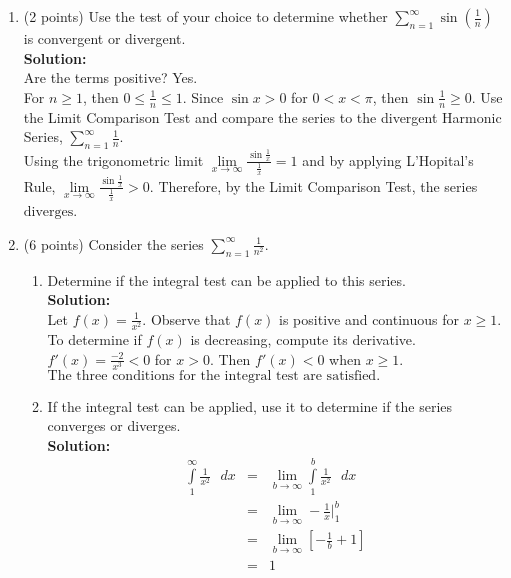 \documentclass[paper=a4, fontsize=11pt]{scrartcl} %
\numberwithin{equation}{section} %
\numberwithin{figure}{section} %
\numberwithin{table}{section} %
\begin{document}
\begin{enumerate}
\item (2 points) Use the test of your choice to determine whether 
$\sum\limits_{n=1}^\infty \sin \left( \frac{1}{n} \right)$ is convergent or divergent. \\
\noindent\textbf{Solution:}\\
Are the terms positive? Yes.\\
For $n \ge 1$, then $0 \le \frac{1}{n} \le 1$.  Since $\sin x > 0$ for $0 < x < \pi$, then $\sin \frac{1}{n} \ge 0$. Use the Limit Comparison Test and compare the series to the divergent Harmonic Series, $\sum\limits_{n=1}^\infty \frac{1}{n}$. \\

Using the trigonometric limit $\lim\limits_{x \rightarrow \infty} \frac{\sin \frac{1}{x}}{\frac{1}{x}}=1$ and by applying L'Hopital's Rule,  $\lim\limits_{x \rightarrow \infty} \frac{\sin \frac{1}{x}}{\frac{1}{x}}>0$. Therefore, by the Limit Comparison Test, the series $\boxed{ \text{diverges}}$.


\newpage

\item (6 points) Consider the series $\sum\limits_{n=1}^\infty \frac{1}{n^2}$.
\begin{enumerate}
\item Determine if the integral test can be applied to this series.\\
\noindent\textbf{Solution:}\\
Let $f(x)=\frac{1}{x^2}$. Observe that $f(x)$ is positive and continuous for $x \ge 1$.  To determine if $f(x)$ is decreasing, compute its derivative.  $f'(x)=\frac{-2}{x^3}<0$ for $x>0$.  Then $f'(x)<0$ when $x \ge 1$.  $\boxed{ \text{The three conditions for the integral test are satisfied.}}$

\vspace{.25in}

\item If the integral test can be applied, use it to determine if the series converges or diverges.\\
\noindent\textbf{Solution:}\\
\begin{eqnarray*}
\int\limits_1^\infty \frac{1}{x^2} \text{ } dx & = & \lim\limits_{b \rightarrow \infty} \int\limits_1^b \frac{1}{x^2} \text{ } dx \\
& = & \lim\limits_{b \rightarrow \infty}  -\frac{1}{x} |_1^b \\
& = & \lim\limits_{b \rightarrow \infty} 
\left[ -\frac{1}{b} + 1 \right] \\
& = & 1
\end{eqnarray*}


\end{enumerate}
\end{enumerate}
\end{document}

